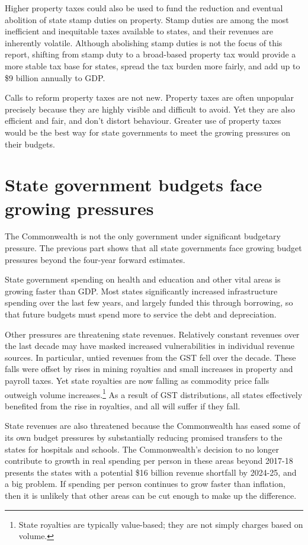 \documentclass[twoside,english]{grattanBudgetRepairb5portrait}
\begin{document}
\begin{overview}[-25pt]
Higher property taxes could also be used to fund the reduction and eventual abolition of state stamp duties on property. Stamp duties are among the most inefficient and inequitable taxes available to states, and their revenues are inherently volatile. Although abolishing stamp duties is not the focus of this report, shifting from stamp duty to a broad-based property tax would provide a more stable tax base for states, spread the tax burden more fairly, and add up to \$9 billion annually to GDP. 

Calls to reform property taxes are not new. Property taxes are often unpopular precisely because they are highly visible and difficult to avoid. Yet they are also efficient and fair, and don’t distort behaviour. Greater use of property taxes would be the best way for state governments to meet the growing pressures on their budgets.
\end{overview}
\chapter{State government budgets face growing pressures}\label{chapter:PROP-1}
The Commonwealth is not the only government under significant budgetary pressure. The previous part shows that all state governments face growing budget pressures beyond the four-year forward estimates. 

State government spending on health and education and other vital areas is growing faster than GDP\@. Most states significantly increased infrastructure spending over the last few years, and largely funded this through borrowing, so that future budgets must spend more to service the debt and depreciation. 

Other pressures are threatening state revenues. Relatively constant revenues over the last decade may have masked increased vulnerabilities in individual revenue sources. In particular, untied revenues from the GST fell over the decade.  These falls were offset by rises in mining royalties and small increases in property and payroll taxes. Yet state royalties are now falling as commodity price falls outweigh volume increases.\footnote{State royalties are typically value-based; they are not simply charges based on volume.}  As a result of GST distributions, all states effectively benefited from the rise in royalties, and all will suffer if they fall. 

State revenues are also threatened because the Commonwealth has eased some of its own budget pressures by substantially reducing promised transfers to the states for hospitals and schools. The Commonwealth’s decision to no longer contribute to growth in real spending per person in these areas beyond 2017-18 presents the states with a potential \$16 billion revenue shortfall by 2024-25, and a big problem.  If spending per person continues to grow faster than inflation, then it is unlikely that other areas can be cut enough to make up the difference. 
\end{document}
